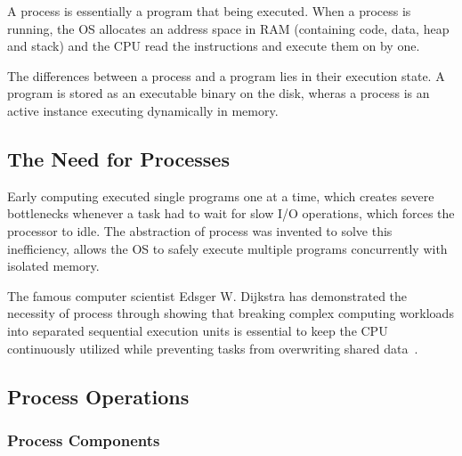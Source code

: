 \documentclass[11pt,a4paper]{article}
\begin{document}
A process is essentially a program that being executed. When a process is running, the OS allocates
an address space in RAM (containing code, data, heap and stack) and the CPU read the instructions
and execute them on by one.

\hspace{5pt}

\noindent The differences between a process and a program lies in their execution state.
A program is stored as an executable binary on the disk, wheras a process is an active instance executing dynamically in memory.

\subsection{The Need for Processes}

Early computing executed single programs one at a time, which creates severe bottlenecks whenever a task had to wait for slow I/O operations, which forces the processor to idle. The 
abstraction of process was invented to solve this inefficiency, allows the OS to safely execute multiple programs concurrently with isolated memory.

\hspace{5pt}

\noindent The famous computer scientist Edsger W. Dijkstra has demonstrated the necessity of process through 
showing that breaking complex computing workloads into separated sequential execution units is essential to keep the CPU
continuously utilized while preventing tasks from overwriting shared data~\cite{dijkstra1968the}.

\subsection{Process Operations}

\subsubsection{Process Components}
\end{document}
